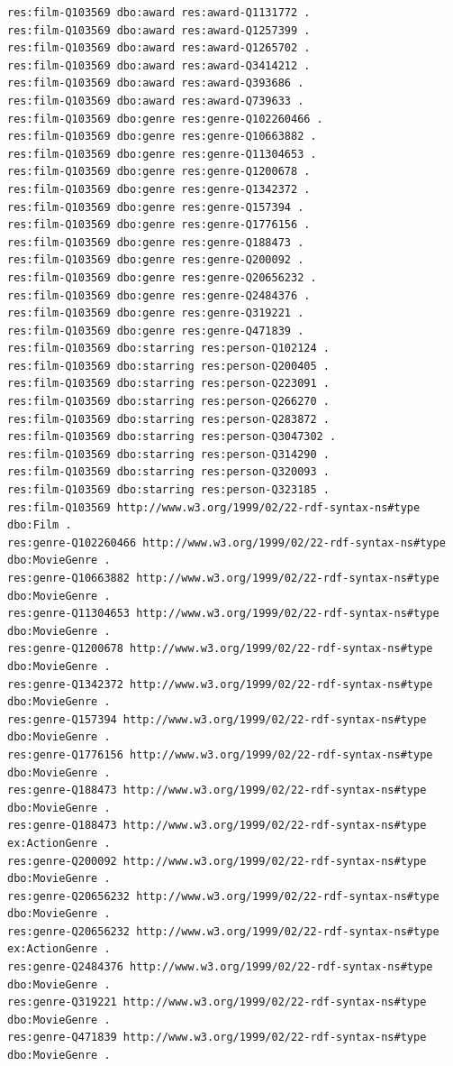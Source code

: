 \documentclass[
  11pt,
]{article}
\begin{document}
\begin{verbatim}
res:film-Q103569 dbo:award res:award-Q1131772 .
res:film-Q103569 dbo:award res:award-Q1257399 .
res:film-Q103569 dbo:award res:award-Q1265702 .
res:film-Q103569 dbo:award res:award-Q3414212 .
res:film-Q103569 dbo:award res:award-Q393686 .
res:film-Q103569 dbo:award res:award-Q739633 .
res:film-Q103569 dbo:genre res:genre-Q102260466 .
res:film-Q103569 dbo:genre res:genre-Q10663882 .
res:film-Q103569 dbo:genre res:genre-Q11304653 .
res:film-Q103569 dbo:genre res:genre-Q1200678 .
res:film-Q103569 dbo:genre res:genre-Q1342372 .
res:film-Q103569 dbo:genre res:genre-Q157394 .
res:film-Q103569 dbo:genre res:genre-Q1776156 .
res:film-Q103569 dbo:genre res:genre-Q188473 .
res:film-Q103569 dbo:genre res:genre-Q200092 .
res:film-Q103569 dbo:genre res:genre-Q20656232 .
res:film-Q103569 dbo:genre res:genre-Q2484376 .
res:film-Q103569 dbo:genre res:genre-Q319221 .
res:film-Q103569 dbo:genre res:genre-Q471839 .
res:film-Q103569 dbo:starring res:person-Q102124 .
res:film-Q103569 dbo:starring res:person-Q200405 .
res:film-Q103569 dbo:starring res:person-Q223091 .
res:film-Q103569 dbo:starring res:person-Q266270 .
res:film-Q103569 dbo:starring res:person-Q283872 .
res:film-Q103569 dbo:starring res:person-Q3047302 .
res:film-Q103569 dbo:starring res:person-Q314290 .
res:film-Q103569 dbo:starring res:person-Q320093 .
res:film-Q103569 dbo:starring res:person-Q323185 .
res:film-Q103569 http://www.w3.org/1999/02/22-rdf-syntax-ns#type dbo:Film .
res:genre-Q102260466 http://www.w3.org/1999/02/22-rdf-syntax-ns#type dbo:MovieGenre .
res:genre-Q10663882 http://www.w3.org/1999/02/22-rdf-syntax-ns#type dbo:MovieGenre .
res:genre-Q11304653 http://www.w3.org/1999/02/22-rdf-syntax-ns#type dbo:MovieGenre .
res:genre-Q1200678 http://www.w3.org/1999/02/22-rdf-syntax-ns#type dbo:MovieGenre .
res:genre-Q1342372 http://www.w3.org/1999/02/22-rdf-syntax-ns#type dbo:MovieGenre .
res:genre-Q157394 http://www.w3.org/1999/02/22-rdf-syntax-ns#type dbo:MovieGenre .
res:genre-Q1776156 http://www.w3.org/1999/02/22-rdf-syntax-ns#type dbo:MovieGenre .
res:genre-Q188473 http://www.w3.org/1999/02/22-rdf-syntax-ns#type dbo:MovieGenre .
res:genre-Q188473 http://www.w3.org/1999/02/22-rdf-syntax-ns#type ex:ActionGenre .
res:genre-Q200092 http://www.w3.org/1999/02/22-rdf-syntax-ns#type dbo:MovieGenre .
res:genre-Q20656232 http://www.w3.org/1999/02/22-rdf-syntax-ns#type dbo:MovieGenre .
res:genre-Q20656232 http://www.w3.org/1999/02/22-rdf-syntax-ns#type ex:ActionGenre .
res:genre-Q2484376 http://www.w3.org/1999/02/22-rdf-syntax-ns#type dbo:MovieGenre .
res:genre-Q319221 http://www.w3.org/1999/02/22-rdf-syntax-ns#type dbo:MovieGenre .
res:genre-Q471839 http://www.w3.org/1999/02/22-rdf-syntax-ns#type dbo:MovieGenre .
\end{verbatim}
\end{document}
